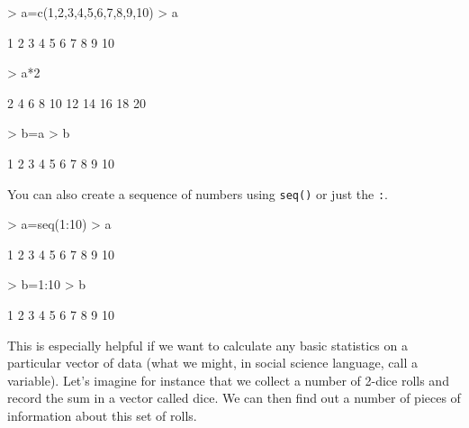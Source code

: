 \documentclass[12pt]{article}
\begin{document}
\begin{Schunk}
\begin{Sinput}
> a=c(1,2,3,4,5,6,7,8,9,10)
> a
\end{Sinput}
\begin{Soutput}
 [1]  1  2  3  4  5  6  7  8  9 10
\end{Soutput}
\begin{Sinput}
> a*2
\end{Sinput}
\begin{Soutput}
 [1]  2  4  6  8 10 12 14 16 18 20
\end{Soutput}
\begin{Sinput}
> b=a
> b
\end{Sinput}
\begin{Soutput}
 [1]  1  2  3  4  5  6  7  8  9 10
\end{Soutput}
\end{Schunk}

You can also create a sequence of numbers using \verb|seq()| or just the \verb|:|.
\begin{Schunk}
\begin{Sinput}
> a=seq(1:10)
> a
\end{Sinput}
\begin{Soutput}
 [1]  1  2  3  4  5  6  7  8  9 10
\end{Soutput}
\begin{Sinput}
> b=1:10
> b
\end{Sinput}
\begin{Soutput}
 [1]  1  2  3  4  5  6  7  8  9 10
\end{Soutput}
\end{Schunk}

This is especially helpful if we want to calculate any basic statistics on a particular vector of data (what we might, in social science language, call a variable). Let's imagine for instance that we collect a number of 2-dice rolls and record the sum in a vector called dice. We can then find out a number of pieces of information about this set of rolls.
\end{document}
